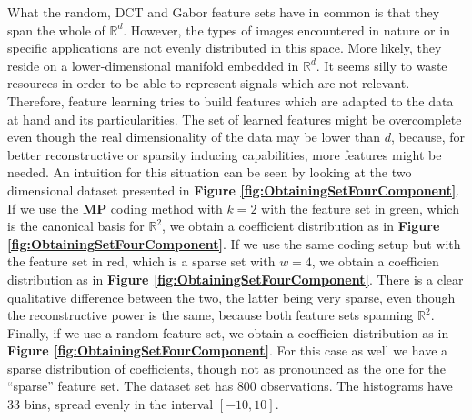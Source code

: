 \documentclass[12pt,a4paper,oneside,english]{UPBThesis}
\newcommand{\hcsignalspace}{\mathbb{R}^d}
\begin{document}
What the random, DCT and Gabor feature sets have in common is that they span the whole of $\hcsignalspace$. However, the types of images encountered in nature or in specific applications are not evenly distributed in this space. More likely, they reside on a lower-dimensional manifold embedded in $\hcsignalspace$. It seems silly to waste resources in order to be able to represent signals which are not relevant. Therefore, feature learning tries to build features which are adapted to the data at hand and its particularities. The set of learned features might be overcomplete even though the real dimensionality of the data may be lower than $d$, because, for better reconstructive or sparsity inducing capabilities, more features might be needed. An intuition for this situation can be seen by looking at the two dimensional dataset presented in \textbf{Figure \ref{fig:ObtainingSetFourComponent}}. If we use the \textbf{MP} coding method with $k=2$ with the feature set in green, which is the canonical basis for $\mathbb{R}^2$, we obtain a coefficient distribution as in \textbf{Figure \ref{fig:ObtainingSetFourComponent}}. If we use the same coding setup but with the feature set in red, which is a sparse set with $w=4$, we obtain a coefficien distribution as in \textbf{Figure \ref{fig:ObtainingSetFourComponent}}. There is a clear qualitative difference between the two, the latter being very sparse, even though the reconstructive power is the same, because both feature sets spanning $\mathbb{R}^2$. Finally, if we use a random feature set, we obtain a coefficien distribution as in \textbf{Figure \ref{fig:ObtainingSetFourComponent}}. For this case as well we have a sparse distribution of coefficients, though not as pronounced as the one for the ``sparse'' feature set. The dataset set has $800$ observations. The histograms have $33$ bins, spread evenly in the interval $[-10,10]$. 
\end{document}
